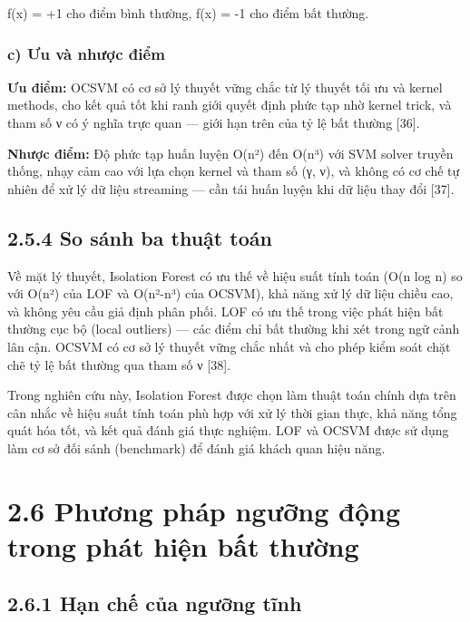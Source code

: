 \documentclass[
  a4paper]{report}
\begin{document}
f(x) = +1 cho điểm bình thường, f(x) = -1 cho điểm bất thường.

\subsubsection{c) Ưu và nhược
điểm}\label{c-ux1b0u-vuxe0-nhux1b0ux1ee3c-ux111iux1ec3m}

\textbf{Ưu điểm:} OCSVM có cơ sở lý thuyết vững chắc từ lý thuyết tối ưu
và kernel methods, cho kết quả tốt khi ranh giới quyết định phức tạp nhờ
kernel trick, và tham số ν có ý nghĩa trực quan --- giới hạn trên của tỷ
lệ bất thường {[}36{]}.

\textbf{Nhược điểm:} Độ phức tạp huấn luyện O(n²) đến O(n³) với SVM
solver truyền thống, nhạy cảm cao với lựa chọn kernel và tham số (γ, ν),
và không có cơ chế tự nhiên để xử lý dữ liệu streaming --- cần tái huấn
luyện khi dữ liệu thay đổi {[}37{]}.

\subsection{2.5.4 So sánh ba thuật
toán}\label{so-suxe1nh-ba-thuux1eadt-touxe1n}

Về mặt lý thuyết, Isolation Forest có ưu thế về hiệu suất tính toán (O(n
log n) so với O(n²) của LOF và O(n²-n³) của OCSVM), khả năng xử lý dữ
liệu chiều cao, và không yêu cầu giả định phân phối. LOF có ưu thế trong
việc phát hiện bất thường cục bộ (local outliers) --- các điểm chỉ bất
thường khi xét trong ngữ cảnh lân cận. OCSVM có cơ sở lý thuyết vững
chắc nhất và cho phép kiểm soát chặt chẽ tỷ lệ bất thường qua tham số ν
{[}38{]}.

Trong nghiên cứu này, Isolation Forest được chọn làm thuật toán chính
dựa trên cân nhắc về hiệu suất tính toán phù hợp với xử lý thời gian
thực, khả năng tổng quát hóa tốt, và kết quả đánh giá thực nghiệm. LOF
và OCSVM được sử dụng làm cơ sở đối sánh (benchmark) để đánh giá khách
quan hiệu năng.

\section{2.6 Phương pháp ngưỡng động trong phát hiện bất
thường}\label{phux1b0ux1a1ng-phuxe1p-ngux1b0ux1ee1ng-ux111ux1ed9ng-trong-phuxe1t-hiux1ec7n-bux1ea5t-thux1b0ux1eddng}

\subsection{2.6.1 Hạn chế của ngưỡng
tĩnh}\label{hux1ea1n-chux1ebf-cux1ee7a-ngux1b0ux1ee1ng-tux129nh}
\end{document}
